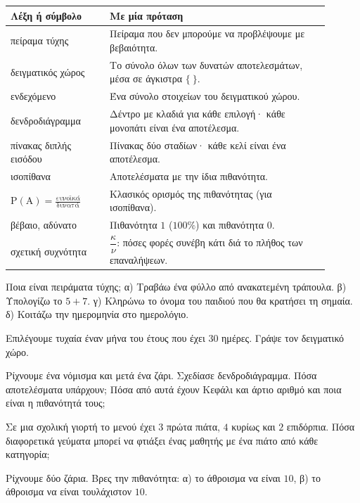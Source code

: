 

\renewcommand{\arraystretch}{1.5}
\begin{longtable}{@{}>{\raggedright\arraybackslash}p{0.28\linewidth} >{\raggedright\arraybackslash}p{0.62\linewidth}@{}}
\toprule
\textbf{Λέξη ή σύμβολο} & \textbf{Με μία πρόταση}\\
\midrule
\endhead
πείραμα τύχης & Πείραμα που δεν μπορούμε να προβλέψουμε με βεβαιότητα.\\
δειγματικός χώρος & Το σύνολο όλων των δυνατών αποτελεσμάτων, μέσα σε άγκιστρα $\{\ \}$.\\
ενδεχόμενο & Ένα σύνολο στοιχείων του δειγματικού χώρου.\\
δενδροδιάγραμμα & Δέντρο με κλαδιά για κάθε επιλογή· κάθε μονοπάτι είναι ένα αποτέλεσμα.\\
πίνακας διπλής εισόδου & Πίνακας δύο σταδίων· κάθε κελί είναι ένα αποτέλεσμα.\\
ισοπίθανα & Αποτελέσματα με την ίδια πιθανότητα.\\
$\mathrm{Ρ}(\mathrm{Α})=\frac{\text{ευνοϊκά}}{\text{δυνατά}}$ & Κλασικός ορισμός της πιθανότητας (για ισοπίθανα).\\
βέβαιο, αδύνατο & Πιθανότητα $1$ ($100\%$) και πιθανότητα $0$.\\
σχετική συχνότητα & $\dfrac{\kappa}{\nu}$: πόσες φορές συνέβη κάτι διά το πλήθος των επαναλήψεων.\\
\bottomrule
\end{longtable}


\ex Ποια είναι πειράματα τύχης; α) Τραβάω ένα φύλλο από ανακατεμένη τράπουλα. β) Υπολογίζω το $5+7$. γ) Κληρώνω το όνομα του παιδιού που θα κρατήσει τη σημαία. δ) Κοιτάζω την ημερομηνία στο ημερολόγιο.

\ex Επιλέγουμε τυχαία έναν μήνα του έτους που έχει $30$ ημέρες. Γράψε τον δειγματικό χώρο.

\ex Ρίχνουμε ένα νόμισμα και μετά ένα ζάρι. Σχεδίασε δενδροδιάγραμμα. Πόσα αποτελέσματα υπάρχουν; Πόσα από αυτά έχουν Κεφάλι και άρτιο αριθμό και ποια είναι η πιθανότητά τους;

\ex Σε μια σχολική γιορτή το μενού έχει $3$ πρώτα πιάτα, $4$ κυρίως και $2$ επιδόρπια. Πόσα διαφορετικά γεύματα μπορεί να φτιάξει ένας μαθητής με ένα πιάτο από κάθε κατηγορία;

\ex Ρίχνουμε δύο ζάρια. Βρες την πιθανότητα: α) το άθροισμα να είναι $10$, β) το άθροισμα να είναι τουλάχιστον $10$.


